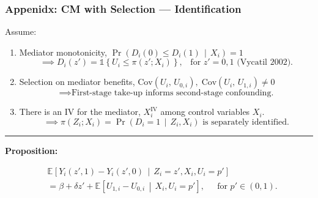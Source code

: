 \documentclass[dvipsnames]{beamer} %
\renewcommand{\vec}[1]{\boldsymbol{\mathit{#1}}}                           %
\newcommand{\Probgiven}[2]{\Pr\left( #1 \, \middle\vert \, #2 \right)} %
\newcommand{\Egiven}[3][]{\mathbb{E}_{#1} \left[ #2 \, \middle\vert \, #3 \right]} %
\newcommand{\Cov}[1]{\text{Cov} \left( #1 \right)}                         %
\newcommand{\indicator}[1]{\mathds{1}\left\{ #1 \right\}}                  %
\begin{document}
\begin{frame}[noframenumbering]
    \frametitle{Appenidx: CM with Selection --- Identification}
    Assume:
    \begin{enumerate}
        \item Mediator monotonicity,
        $\Probgiven{ D_i(0) \leq D_i(1) }{\vec X_i} = 1$
        \[ \implies D_i(z') = \indicator{U_i \leq \pi(z'; \vec X_i)},
            \;\;\; \text{for } z'=0,1 \text{  (Vycatil 2002)}. \]
        \item Selection on mediator benefits,
        $\Cov{U_i, \, U_{0,i}}, \; \Cov{U_i, \, U_{1,i}} \neq 0$
        \[ \implies \text{First-stage take-up informs second-stage confounding.} \]
        \item There is an IV for the mediator, $\vec X_i^{\text{IV}}$ among control variables $\vec X_i$.
        \[ \implies \pi(Z_i ; \vec X_i) = \Probgiven{D_i = 1}{Z_i,\vec X_i} 
        \text{ is separately identified.} \]
    \end{enumerate}
    \par\noindent\rule{\textwidth}{0.4pt}
    \textbf{Proposition:}

    \vskip-0.5cm
    \begin{align*}
        & \Egiven{Y_i(z', 1) - Y_i(z', 0)}{Z_i = z', \vec X_i, U_i = p'} \\
        &= \beta + \delta z' + \Egiven{U_{1,i} - U_{0,i}}{\vec X_i, U_i = p'},
        \;\;\;\; \text{ for } p' \in (0,1).
    \end{align*}
\end{frame}
\end{document}
